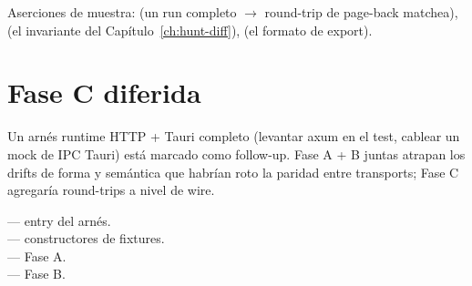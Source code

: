 Aserciones de muestra:
 (un run
completo $\to$ round-trip de page-back matchea),
 (el invariante del
Capítulo~\ref{ch:hunt-diff}),
(el formato de export).

\section{Fase C diferida}

Un arnés runtime HTTP + Tauri completo (levantar axum en el
test, cablear un mock de IPC Tauri) está marcado como follow-up.
Fase A + B juntas atrapan los drifts de forma y semántica que
habrían roto la paridad entre transports; Fase C agregaría
round-trips a nivel de wire.

\begin{inthecode}
 --- entry del arnés.\\
 ---
constructores de fixtures.\\
 --- Fase A.\\
 --- Fase B.
\end{inthecode}
